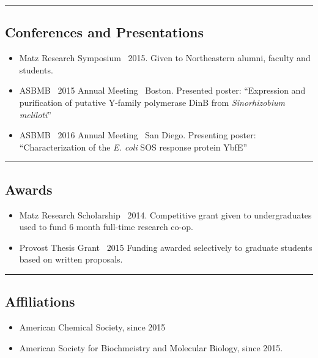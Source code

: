 \documentclass[10pt,letterpaper]{article}
\begin{document}
\hrule
\vspace{-0.4em}
\subsection*{Conferences and Presentations}

\begin{itemize}
  \parskip=0.1em

\item Matz Research Symposium \textbullet \ 2015. Given to Northeastern
  alumni, faculty and students.
\item ASBMB \textbullet \ 2015 Annual Meeting \textbullet \ Boston.
  Presented poster: ``Expression and purification of
  putative Y-family polymerase DinB from \emph{Sinorhizobium meliloti}''
\item ASBMB \textbullet \ 2016 Annual Meeting \textbullet \ San Diego.
  Presenting poster: ``Characterization of the \emph{E. coli} SOS
  response protein YbfE''

\end{itemize}

\hrule
\vspace{-0.4em}
\subsection*{Awards}

\begin{itemize}
  \parskip=0.1em

\item Matz Research Scholarship \textbullet \ 2014. Competitive grant
  given to undergraduates used to fund 6 month full-time research
  co-op.
\item Provost Thesis Grant \textbullet \ 2015 Funding awarded
  selectively to graduate students based on written proposals.

\end{itemize}

\hrule
\vspace{-0.4em}
\subsection*{Affiliations}

\begin{itemize}
  \parskip=0.1em

\item American Chemical Society, since 2015
\item American Society for Biochmeistry and Molecular Biology, since
  2015.

\end{itemize}
\end{document}

